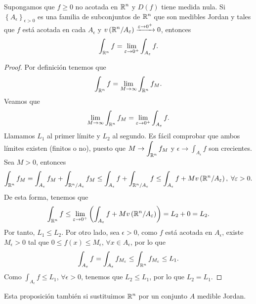 \begin{prop}
	Supongamos que $\displaystyle f \geq 0 $ no acotada en $\displaystyle \mathbb{R}^{n} $ y $\displaystyle D\left(f\right) $ tiene medida nula. Si $\displaystyle \left\{ A_{\epsilon }\right\} _{\epsilon > 0} $ es una familia de subconjuntos de $\displaystyle \mathbb{R}^{n} $ que son medibles Jordan y tales que $\displaystyle f $ está acotada en cada $\displaystyle A_{\epsilon } $ y $\displaystyle v\left(\mathbb{R}^{n}/A_{\varepsilon }\right)\xrightarrow{\varepsilon \to 0^{+}} 0$, entonces
	\[\int _{\mathbb{R}^{n}}f =\lim_{\varepsilon  \to 0^{+}}\int _{A_{\varepsilon }}f  .\]
\end{prop}
\begin{proof}
Por definición tenemos que 
\[\int _{\mathbb{R}^{n}}f =\lim_{M \to \infty}\int _{\mathbb{R}^{n}}f_{M} .\]
Veamos que 
\[\lim_{M \to \infty}\int _{\mathbb{R}^{n}} f_{M} = \lim_{\varepsilon  \to 0^{+}}\int _{A_{\varepsilon }}f .\]
Llamamos $\displaystyle L_{1} $ al primer límite y $\displaystyle L_{2} $ al segundo. Es fácil comprobar que ambos límites existen (finitos o no), puesto que $\displaystyle M \to \int _{\mathbb{R}^{n}}f_{M}  $ y $\displaystyle \epsilon \to \int _{A_{\epsilon }}f  $ son crecientes. Sea $\displaystyle M > 0 $, entonces
\[\int _{\mathbb{R}^{n}}f_{M} =\int _{A_{\varepsilon }}f_{M} +\int _{\mathbb{R}^{n}/A_{\varepsilon }}f_{M} \leq \int _{A_{\varepsilon }}f +\int _{\mathbb{R}^{n}/A_{\varepsilon }} f \leq \int _{A_{\varepsilon }}f +Mv\left(\mathbb{R}^{n}/A_{\varepsilon }\right), \; \forall \varepsilon > 0 .\]
De esta forma, tenemos que 
\[\int _{\mathbb{R}^{n}}f \leq \lim_{\varepsilon  \to 0^{+}}\left(\int _{A_{\varepsilon }}f +Mv\left(\mathbb{R}^{n}/A_{\varepsilon }\right)\right)=L_{2}+0=L_{2} .\]
Por tanto, $\displaystyle L_{1}\leq L_{2} $. Por otro lado, sea $\displaystyle \epsilon > 0 $, como $\displaystyle f $ está acotada en $\displaystyle A_{\epsilon } $, existe $\displaystyle M_{\epsilon } >0 $ tal que $\displaystyle 0 \leq f\left(x\right)\leq M_{\epsilon } $, $\displaystyle \forall x \in A_{\epsilon } $, por lo que
\[\int _{A_{\varepsilon }}f =\int _{A_{\varepsilon }}f_{M_{\varepsilon }} \leq \int _{\mathbb{R}^{n}}f_{M_{\varepsilon }} \leq L_{1} .\]
Como $\displaystyle \int _{A_{\epsilon }}f \leq L_{1} $, $\displaystyle \forall \epsilon > 0 $, tenemos que $\displaystyle L_{2}\leq L_{1} $, por lo que $\displaystyle L_{2}=L_{1} $. 
\end{proof}
\begin{observation}
Esta proposición también si sustituimos $\displaystyle \mathbb{R}^{n} $ por un conjunto $\displaystyle A $ medible Jordan.
\end{observation}

